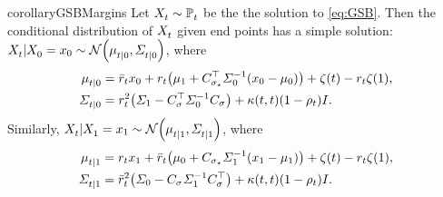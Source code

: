 \begin{restatable}{corollary}{GSBMargins}
\label{cor:GSB-Margins}
Let $X^{}_{ t } \sim \mathbb{P}^{}_{ t }$ be the the solution to \eqref{eq:GSB}. Then the conditional distribution of $X^{}_{ t }$ given end points has a simple solution: $\Xsol \vert \Xsol[0] = x_0 \sim \Ncal\parens*{  \cmeansol{\ctime}{0}, \cSigmasol{\ctime}{0} }$, where
\begin{align}
\cmeansol{\ctime}{0} 
&= \ratioc x_0 + \ratio \parens*{   \malt + C_{\sigma_\star}^\top \covar^{-1}(x_0 - \m) } + \tshift - \ratio \tshift[\horizon], %
\label{eq:cmean-marginal-0}
\\
\cSigmasol{\ctime}{0} &= \ratio^2 \parens*{ \covaralt - \Cstar^\top \covar^{-1}\Cstar } + \kernel[\ctime][\ctime]  \parens*{ 1- \efftr } \eye. %
\label{eq:csigma-marginal-0}
\end{align}
Similarly, $\Xsol \vert \Xsol[\horizon] = x_{\horizon} \sim \Ncal\parens*{  \cmeansol{\ctime}{\horizon}, \cSigmasol{\ctime}{\horizon} }$, where
\begin{align}
\cmeansol{\ctime}{\horizon} 
&= \ratio x_{\horizon} + \ratioc \parens*{   \m + C_{\sigma_\star} \covaralt^{-1}(x_{\horizon} - \malt) } + \tshift - \ratio \tshift[\horizon], %
\label{eq:cmean-marginal-T} \\
\cSigmasol{\ctime}{\horizon} &= \ratioc^2 \parens*{ \covar - \Cstar \covaralt^{-1}\Cstar^{\top} } + \kernel[\ctime][\ctime]  \parens*{ 1- \efftr } \eye. %
\label{eq:csigma-marginal-T}
\end{align}
\end{restatable}


